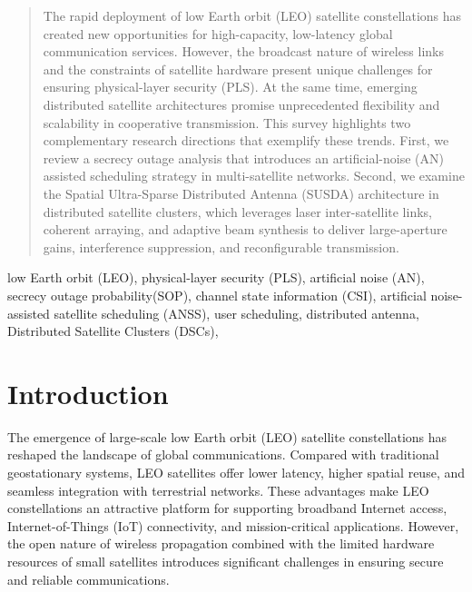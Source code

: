\documentclass[conference]{IEEEtran}
\begin{document}
\begin{abstract}
The rapid deployment of low Earth orbit (LEO) satellite constellations has created new opportunities for high-capacity, low-latency global communication services. However, the broadcast nature of wireless links and the constraints of satellite hardware present unique challenges for ensuring physical-layer security (PLS). At the same time, emerging distributed satellite architectures promise unprecedented flexibility and scalability in cooperative transmission. This survey highlights two complementary research directions that exemplify these trends. First, we review a secrecy outage analysis that introduces an artificial-noise (AN) assisted scheduling strategy in multi-satellite networks. Second, we examine the Spatial Ultra-Sparse Distributed Antenna (SUSDA) architecture in distributed satellite clusters, which leverages laser inter-satellite links, coherent arraying, and adaptive beam synthesis to deliver large-aperture gains, interference suppression, and reconfigurable transmission.
\end{abstract}

\begin{IEEEkeywords}
low Earth orbit (LEO), physical-layer security (PLS), artificial noise (AN), secrecy outage probability(SOP), channel state information (CSI),  artificial noise-assisted satellite scheduling (ANSS), user scheduling, distributed antenna, Distributed Satellite Clusters (DSCs),
\end{IEEEkeywords}


\section{Introduction} \label{sec1}

The emergence of large-scale low Earth orbit (LEO) satellite constellations has reshaped the landscape of global communications. Compared with traditional geostationary systems, LEO satellites offer lower latency, higher spatial reuse, and seamless integration with terrestrial networks. These advantages make LEO constellations an attractive platform for supporting broadband Internet access, Internet-of-Things (IoT) connectivity, and mission-critical applications\cite{OKodheli:20}. However, the open nature of wireless propagation combined with the limited hardware resources of small satellites introduces significant challenges in ensuring secure and reliable communications.
\end{document}
